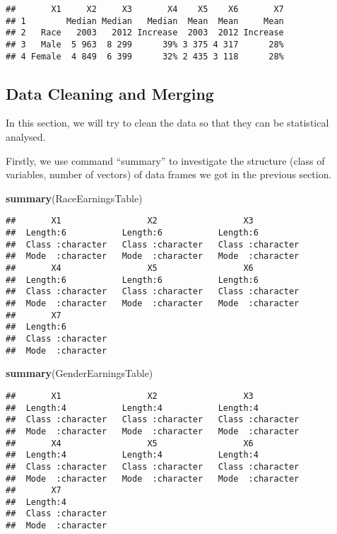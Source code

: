 \documentclass[]{article}
\newenvironment{Shaded}{\begin{snugshade}}{\end{snugshade}}
\newcommand{\KeywordTok}[1]{\textcolor[rgb]{0.13,0.29,0.53}{\textbf{{#1}}}}
\newcommand{\NormalTok}[1]{{#1}}
\begin{document}
\begin{verbatim}
##       X1     X2     X3       X4    X5    X6       X7
## 1        Median Median   Median  Mean  Mean     Mean
## 2   Race   2003   2012 Increase  2003  2012 Increase
## 3   Male  5 963  8 299      39% 3 375 4 317      28%
## 4 Female  4 849  6 399      32% 2 435 3 118      28%
\end{verbatim}

\subsection{Data Cleaning and Merging}\label{data-cleaning-and-merging}

In this section, we will try to clean the data so that they can be
statistical analysed.

Firstly, we use command ``summary'' to investigate the structure (class
of variables, number of vectors) of data frames we got in the previous
section.

\begin{Shaded}
\begin{Highlighting}[]
\KeywordTok{summary}\NormalTok{(RaceEarningsTable)}
\end{Highlighting}
\end{Shaded}

\begin{verbatim}
##       X1                 X2                 X3           
##  Length:6           Length:6           Length:6          
##  Class :character   Class :character   Class :character  
##  Mode  :character   Mode  :character   Mode  :character  
##       X4                 X5                 X6           
##  Length:6           Length:6           Length:6          
##  Class :character   Class :character   Class :character  
##  Mode  :character   Mode  :character   Mode  :character  
##       X7           
##  Length:6          
##  Class :character  
##  Mode  :character
\end{verbatim}

\begin{Shaded}
\begin{Highlighting}[]
\KeywordTok{summary}\NormalTok{(GenderEarningsTable)}
\end{Highlighting}
\end{Shaded}

\begin{verbatim}
##       X1                 X2                 X3           
##  Length:4           Length:4           Length:4          
##  Class :character   Class :character   Class :character  
##  Mode  :character   Mode  :character   Mode  :character  
##       X4                 X5                 X6           
##  Length:4           Length:4           Length:4          
##  Class :character   Class :character   Class :character  
##  Mode  :character   Mode  :character   Mode  :character  
##       X7           
##  Length:4          
##  Class :character  
##  Mode  :character
\end{verbatim}
\end{document}
